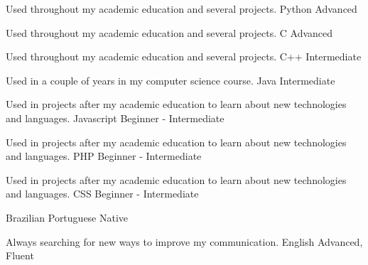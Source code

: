 

\begin{cventries}

    \cventry
    {Used throughout my academic education and several projects.}
    {Python} %
    {Advanced} %
    {}
    {}

    \cventry
    {Used throughout my academic education and several projects.}
    {C} %
    {Advanced} %
    {}
    {}

    \cventry
    {Used throughout my academic education and several projects.}
    {C++} %
    {Intermediate} %
    {}
    {}

    \cventry
    {Used in a couple of years in my computer science course.}
    {Java} %
    {Intermediate} %
    {}
    {}

    \cventry
    {Used in projects after my academic education to learn about new technologies and
    languages.}
    {Javascript} %
    {Beginner - Intermediate} %
    {}
    {}

    \cventry
    {Used in projects after my academic education to learn about new technologies and
    languages.}
    {PHP} %
    {Beginner - Intermediate} %
    {}
    {}

    \cventry
    {Used in projects after my academic education to learn about new technologies and
    languages.}
    {CSS} %
    {Beginner - Intermediate} %
    {}
    {}
\end{cventries}

\begin{cventries}

  \cventry
  {}
  {Brazilian Portuguese}
  {Native}
  {}
  {}

  \cventry
  {Always searching for new ways to improve my communication.}
  {English}
  {Advanced, Fluent}
  {}
  {}

\end{cventries}

